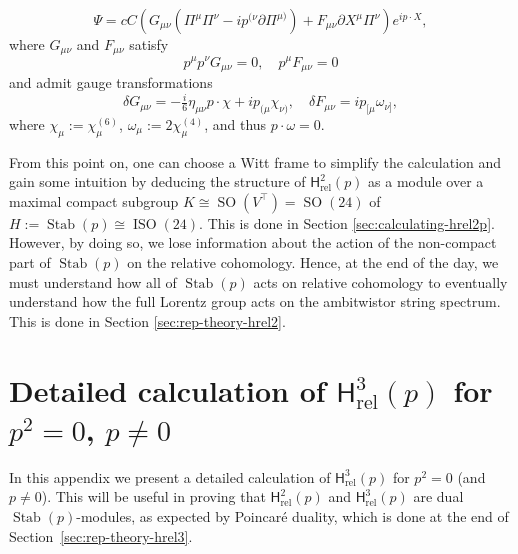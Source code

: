 \documentclass[11pt,reqno,a4paper,final]{amsart}
\theoremstyle{plain}
\theoremstyle{definition}
\renewcommand{\d}{\partial}
\newcommand{\Hrel}{\mathsf{H}_{\mathrm{rel}}}
\newcommand{\Stab}{\operatorname{Stab}}
\newcommand{\1}{\mathbb{1}}
\newcommand{\ISO}{\operatorname{ISO}}
\newcommand{\SO}{\operatorname{SO}}
\numberwithin{equation}{section}
\begin{document}
\begin{appendices}
\begin{equation}
  \Psi = cC \left( G_{\mu\nu} \left(\Pi^\mu \Pi^\nu - i p^{(\nu} \d \Pi^{\mu)} \right)+ F_{\mu\nu} \d X^\mu \Pi^\nu \right) e^{i p\cdot X},
\end{equation}  
where $G_{\mu\nu}$ and $F_{\mu\nu}$ satisfy 
\begin{equation}
  \label{eq:Zrel2-conditions}
  p^\mu p^\nu G_{\mu\nu} = 0, \quad p^\mu F_{\mu\nu}  = 0
\end{equation}
and admit gauge transformations
\begin{equation}
  \label{eq:Brel2-conditions}
    \delta G_{\mu\nu} = -\tfrac i6 \eta_{\mu\nu} p \cdot \chi + i p_{(\mu} \chi_{\nu)}, \quad
    \delta F_{\mu\nu} = i p_{[\mu} \omega_{\nu]},
\end{equation}
where $\chi_\mu := \chi^{(6)}_\mu$, $\omega_\mu := 2 \chi^{(4)}_\mu$, and thus $p \cdot \omega = 0$.

From this point on, one can choose a Witt frame to simplify the calculation and gain some intuition by deducing the structure of $\Hrel^2(p)$ as a module over a maximal compact subgroup $K \cong \SO(V^\top) = \SO(24)$ of $H := \Stab(p) \cong \ISO(24)$. This is done in Section \ref{sec:calculating-hrel2p}. However, by doing so, we lose information about the action of the non-compact part of $\Stab(p)$ on the relative cohomology. Hence, at the end of the day, we must understand how all of $\Stab(p)$ acts on relative cohomology to eventually understand how the full Lorentz group acts on the ambitwistor string spectrum. This is done in Section \ref{sec:rep-theory-hrel2}. 

\section{Detailed calculation of $\Hrel^3(p)$ for $p^2=0$, $p\neq 0$}
\label{app:hrel3-details}

In this appendix we present a detailed calculation of $\Hrel^3(p)$ for
$p^2=0$ (and $p \neq 0$).  This will be useful in proving that
$\Hrel^2(p)$ and $\Hrel^3(p)$ are dual $\Stab(p)$-modules, as
expected by Poincaré duality, which is done at the end of
Section~\ref{sec:rep-theory-hrel3}.


\end{appendices}
\end{document}
